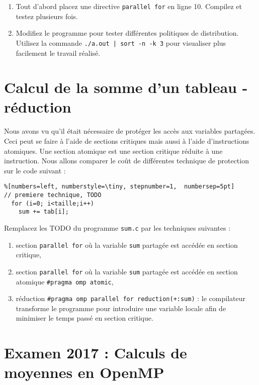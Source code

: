 \documentclass[A4wide]{article}
\begin{document}
\begin{enumerate}
\item Tout d'abord placez une directive \verb#parallel for# en ligne 10. Compilez et 
testez plusieurs fois. 

\item Modifiez le programme pour tester différentes politiques de
  distribution.  Utilisez la commande \verb#./a.out | sort -n -k 3#
  pour visualiser plus facilement le travail réalisé.
\end{enumerate}


\section{Calcul de la somme d'un tableau - réduction}

Nous avons vu qu'il était nécessaire de protéger les accès aux
variables partagées. Ceci peut se faire à l'aide de sections critiques
mais aussi à l'aide d'instructions atomiques. Une section atomique est
une section critique réduite à une instruction. Nous allons comparer
le coût de différentes technique de protection sur le code suivant :

\begin{lstlisting}%[numbers=left, numberstyle=\tiny, stepnumber=1,  numbersep=5pt]
// premiere technique, TODO 
  for (i=0; i<taille;i++) 
    sum += tab[i];
\end{lstlisting}

Remplacez les TODO du programme \verb#sum.c#  par les techniques
suivantes :

\begin{enumerate}
\item section \verb#parallel for# où la variable \verb#sum# partagée
  est accédée en section critique,
\item section \verb#parallel for# où la variable \verb#sum# partagée
  est accédée en section atomique \verb&#pragma omp atomic&,
\item réduction \verb&#pragma omp parallel for reduction(+:sum)& : le
  compilateur transforme le programme pour introduire une variable
  locale afin de minimiser le temps passé en section critique.
\end{enumerate}


\section{Examen 2017 : Calculs de moyennes en OpenMP}
\end{document}
